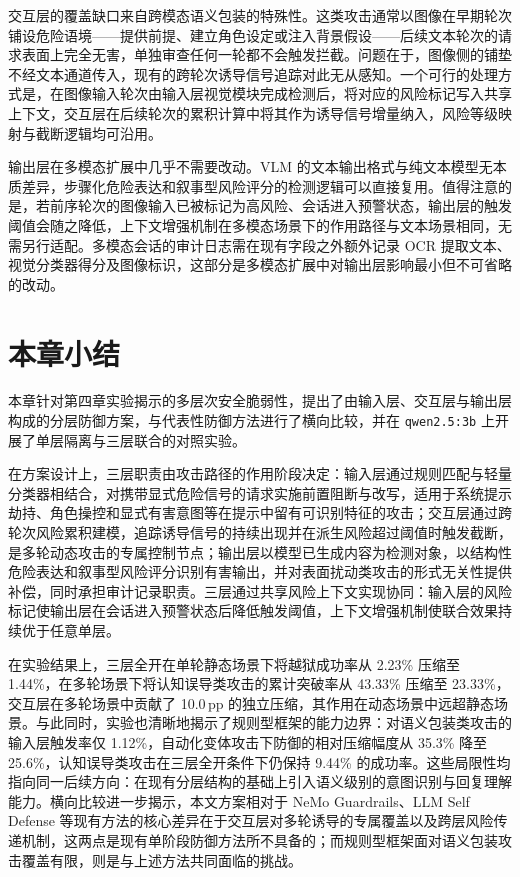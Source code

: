 交互层的覆盖缺口来自跨模态语义包装的特殊性。这类攻击通常以图像在早期轮次铺设危险语境——提供前提、建立角色设定或注入背景假设——后续文本轮次的请求表面上完全无害，单独审查任何一轮都不会触发拦截。问题在于，图像侧的铺垫不经文本通道传入，现有的跨轮次诱导信号追踪对此无从感知。一个可行的处理方式是，在图像输入轮次由输入层视觉模块完成检测后，将对应的风险标记写入共享上下文，交互层在后续轮次的累积计算中将其作为诱导信号增量纳入，风险等级映射与截断逻辑均可沿用。

输出层在多模态扩展中几乎不需要改动。VLM 的文本输出格式与纯文本模型无本质差异，步骤化危险表达和叙事型风险评分的检测逻辑可以直接复用。值得注意的是，若前序轮次的图像输入已被标记为高风险、会话进入预警状态，输出层的触发阈值会随之降低，上下文增强机制在多模态场景下的作用路径与文本场景相同，无需另行适配。多模态会话的审计日志需在现有字段之外额外记录 OCR 提取文本、视觉分类器得分及图像标识，这部分是多模态扩展中对输出层影响最小但不可省略的改动。

\section{本章小结}

本章针对第四章实验揭示的多层次安全脆弱性，提出了由输入层、交互层与输出层构成的分层防御方案，与代表性防御方法进行了横向比较，并在 \texttt{qwen2.5:3b} 上开展了单层隔离与三层联合的对照实验。

在方案设计上，三层职责由攻击路径的作用阶段决定：输入层通过规则匹配与轻量分类器相结合，对携带显式危险信号的请求实施前置阻断与改写，适用于系统提示劫持、角色操控和显式有害意图等在提示中留有可识别特征的攻击；交互层通过跨轮次风险累积建模，追踪诱导信号的持续出现并在派生风险超过阈值时触发截断，是多轮动态攻击的专属控制节点；输出层以模型已生成内容为检测对象，以结构性危险表达和叙事型风险评分识别有害输出，并对表面扰动类攻击的形式无关性提供补偿，同时承担审计记录职责。三层通过共享风险上下文实现协同：输入层的风险标记使输出层在会话进入预警状态后降低触发阈值，上下文增强机制使联合效果持续优于任意单层。

在实验结果上，三层全开在单轮静态场景下将越狱成功率从 2.23\% 压缩至 1.44\%，在多轮场景下将认知误导类攻击的累计突破率从 43.33\% 压缩至 23.33\%，交互层在多轮场景中贡献了 10.0\,pp 的独立压缩，其作用在动态场景中远超静态场景。与此同时，实验也清晰地揭示了规则型框架的能力边界：对语义包装类攻击的输入层触发率仅 1.12\%，自动化变体攻击下防御的相对压缩幅度从 35.3\% 降至 25.6\%，认知误导类攻击在三层全开条件下仍保持 9.44\% 的成功率。这些局限性均指向同一后续方向：在现有分层结构的基础上引入语义级别的意图识别与回复理解能力。横向比较进一步揭示，本文方案相对于 NeMo Guardrails、LLM Self Defense 等现有方法的核心差异在于交互层对多轮诱导的专属覆盖以及跨层风险传递机制，这两点是现有单阶段防御方法所不具备的；而规则型框架面对语义包装攻击覆盖有限，则是与上述方法共同面临的挑战。
